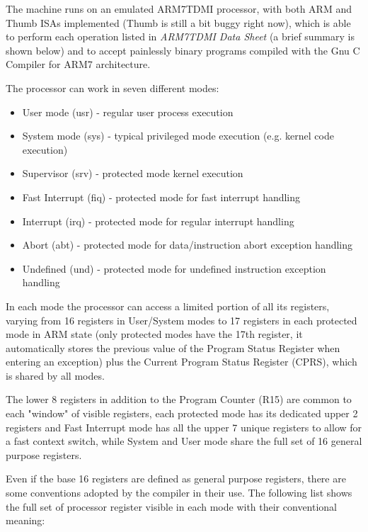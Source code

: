 The \uarm{} machine runs on an emulated ARM7TDMI processor, with both ARM and Thumb ISAs implemented (Thumb is still a bit buggy right now), which is able to perform each operation listed in \emph{ARM7TDMI Data Sheet} (a brief summary is shown below) and to accept painlessly binary programs compiled with the Gnu C Compiler for ARM7 architecture.

The processor can work in seven different modes:
\begin{itemize}
\item User mode (usr) - regular user process execution
\item System mode (sys) - typical privileged mode execution (e.g. kernel code execution)
\item Supervisor (srv) - protected mode kernel execution
\item Fast Interrupt (fiq) - protected mode for fast interrupt handling
\item Interrupt (irq) - protected mode for regular interrupt handling
\item Abort (abt) - protected mode for data/instruction abort exception handling
\item Undefined (und) - protected mode for undefined instruction exception handling
\end{itemize}

In each mode the processor can access a limited portion of all its registers, varying from 16 registers in User/System modes to 17 registers in each protected mode in ARM state (only protected modes have the 17th register, it automatically stores the previous value of the Program Status Register when entering an exception) plus the Current Program Status Register (CPRS), which is shared by all modes.

The lower 8 registers in addition to the Program Counter (R15) are common to each "window" of visible registers, each protected mode has its dedicated upper 2 registers and Fast Interrupt mode has all the upper 7 unique registers to allow for a fast context switch, while System and User mode share the full set of 16 general purpose registers.

\vspace{5px}
\begin{adjustbox}{center}

\end{adjustbox}
\vspace{5px}

Even if the base 16 registers are defined as general purpose registers, there are some conventions adopted by the compiler in their use. The following list shows the full set of processor register visible in each mode with their conventional meaning:

